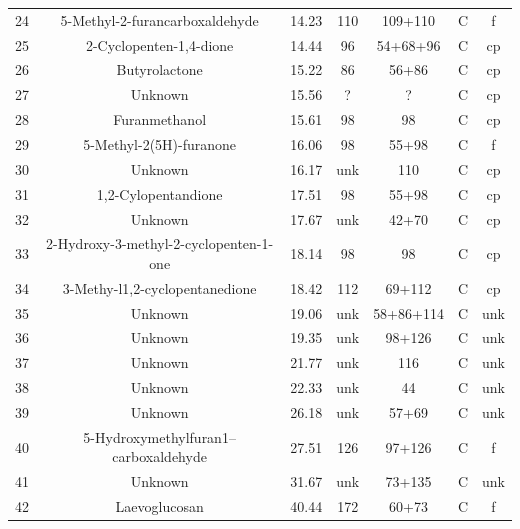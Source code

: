 \documentclass[preprint,review,12pt]{elsarticle}
\begin{document}
\begin{table}[h!]
\begin{center}
{\begin{tabular}{ccccccc}
  24 & 5-Methyl-2-furancarboxaldehyde & 14.23 & 110 & 109+110 & C & f \\ 
  25 & 2-Cyclopenten-1,4-dione & 14.44 & 96 & 54+68+96 & C & cp \\ 
  26 & Butyrolactone & 15.22 & 86 & 56+86 & C & cp \\ 
  27 & Unknown & 15.56 & ? & ? & C & cp \\ 
  28 & Furanmethanol & 15.61 & 98 & 98 & C & cp \\ 
  29 & 5-Methyl-2(5H)-furanone & 16.06 & 98 & 55+98 & C & f \\ 
  30 & Unknown & 16.17 & unk & 110 & C & cp \\ 
  31 & 1,2-Cylopentandione & 17.51 & 98 & 55+98 & C & cp \\ 
  32 & Unknown & 17.67 & unk & 42+70 & C & cp \\ 
  33 & 2-Hydroxy-3-methyl-2-cyclopenten-1-one & 18.14 & 98 & 98 & C & cp \\ 
  34 & 3-Methy-l1,2-cyclopentanedione & 18.42 & 112 & 69+112 & C & cp \\ 
  35 & Unknown & 19.06 & unk & 58+86+114 & C & unk \\ 
  36 & Unknown & 19.35 & unk & 98+126 & C & unk \\ 
  37 & Unknown & 21.77 & unk & 116 & C & unk \\ 
  38 & Unknown & 22.33 & unk & 44 & C & unk \\ 
  39 & Unknown & 26.18 & unk & 57+69 & C & unk \\ 
  40 & 5-Hydroxymethylfuran1--carboxaldehyde & 27.51 & 126 & 97+126 & C & f \\ 
  41 & Unknown & 31.67 & unk & 73+135 & C & unk \\ 
  42 & Laevoglucosan & 40.44 & 172 & 60+73 & C & f \\ 
   \hline
\end{tabular}
}
\end{center}
\end{table}
\end{document}
